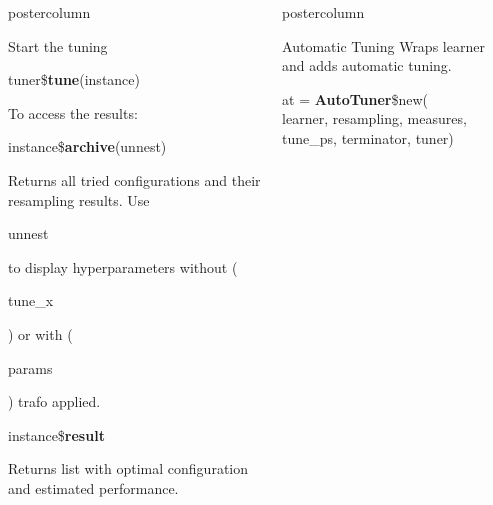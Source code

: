 \documentclass{beamer}
\newlength{\columnheight} %
\newcommand{\codeinline}[1]{\begin{codeboxinline}#1\end{codeboxinline}}
\begin{document}
\begin{frame}[fragile]{}
\begin{columns}
\begin{column}{.245\textwidth}
\begin{beamercolorbox}[center]{postercolumn}
\begin{minipage}{.98\textwidth}
{\begin{myblock}{Start the tuning}
							\begin{codebox}
								tuner\$\textbf{tune}(instance)
							\end{codebox}
                            To access the results: 
							\begin{codebox}
								instance\$\textbf{archive}(unnest)
							\end{codebox}
							Returns all tried configurations and their resampling results. Use \codeinline{unnest} to display hyperparameters without (\codeinline{tune\_x}) or with (\codeinline{params}) trafo applied.
							\\
							\begin{codebox}
								instance\$\textbf{result}
							\end{codebox}
							Returns list with optimal configuration and estimated performance.
						\end{myblock}
						\vfill}
				\end{minipage}
			\end{beamercolorbox}
		\end{column}
		\begin{column}{.245\textwidth}
			\begin{beamercolorbox}[center]{postercolumn}
				\begin{minipage}{.98\textwidth}
					\parbox[t][\columnheight]{\textwidth}{
						\begin{myblock}{Automatic Tuning}
							Wraps learner and adds automatic tuning. 
							\\
							\begin{codeboxmultiline}[width=20cm]
								at = \textbf{AutoTuner}\$new(\\
								\hspace*{1ex}learner, resampling, measures, \\
								\hspace*{1ex}tune\_ps, terminator, tuner)
							\end{codeboxmultiline}
							\vspace{1em}

\end{myblock}}
\end{minipage}
\end{beamercolorbox}
\end{column}
\end{columns}
\end{frame}
\end{document}

